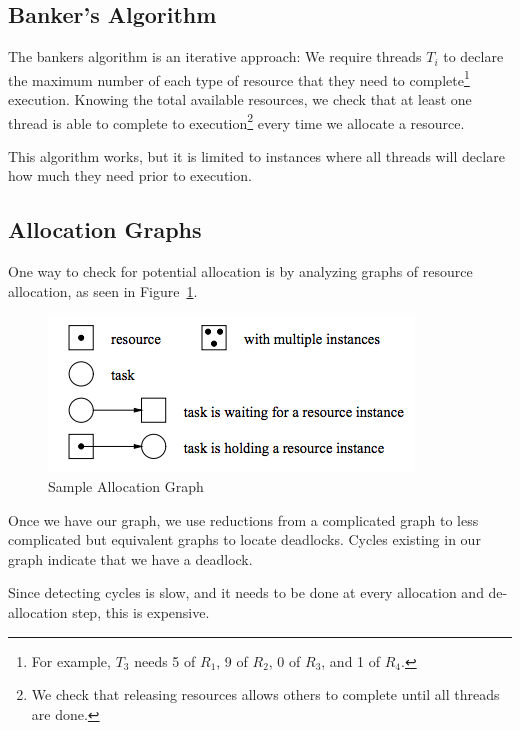             \subsection{Banker's Algorithm} %
            \label{sub:banker_s_algorithm}
                The bankers algorithm is an iterative approach:
                We require threads $T_i$ to declare the maximum number of each type of resource that they need to complete\footnote{For example, $T_3$ needs 5 of $R_1$, 9 of $R_2$, 0 of $R_3$, and 1 of $R_4$.} execution.
                Knowing the total available resources, we check that at least one thread is able to complete to execution\footnote{We check that releasing resources allows others to complete until all threads are done.} every time we allocate a resource.

                This algorithm works, but it is limited to instances where all threads will declare how much they need prior to execution.
            \subsection{Allocation Graphs} %
            \label{sub:allocation_graphs}
                One way to check for potential allocation is by analyzing graphs of resource allocation, as seen in Figure~\ref{fig:allocation_graph}.
                \begin{figure}[h]
                    \centering
                    \label{fig:allocation_graph}
                    \caption{Sample Allocation Graph}
                    \includegraphics{images/allocation_graph.png}
                \end{figure}
                Once we have our graph, we use reductions from a complicated graph to less complicated but equivalent graphs to locate deadlocks.
                Cycles existing in our graph indicate that we have a deadlock.

                Since detecting cycles is slow, and it needs to be done at every allocation and de-allocation step, this is expensive.
